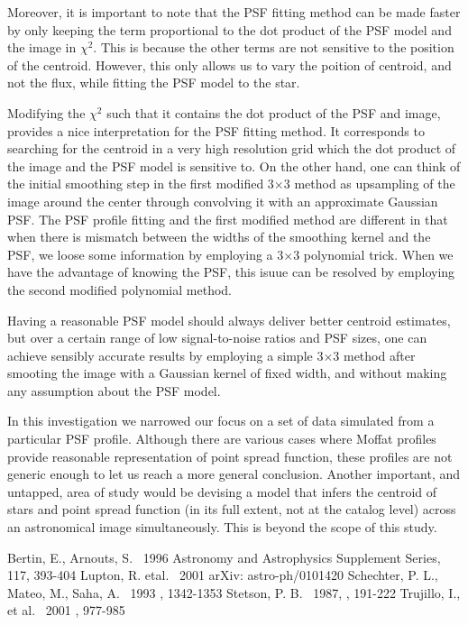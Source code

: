 \documentclass[12pt, preprint]{aastex}
\begin{document}
Moreover, it is important to note that the PSF fitting method can be made faster by only keeping the 
term proportional to the dot product of the PSF model and the image in $\chi^2$. This is because 
the other terms are not sensitive to the position of the centroid. However, this only allows
us to vary the poition of centroid, and not the flux, while fitting the PSF model
to the star. 

Modifying the $\chi^2$ such that it contains the dot product of the PSF and image, 
provides a nice interpretation for the PSF fitting method. It corresponds to searching for the 
centroid in a very high resolution grid which the dot product of the image and the PSF model is
sensitive to. On the other hand, one can think of the initial smoothing step in the first modified 3$\times$3 method 
as upsampling of the image around the center through convolving it with an approximate Gaussian PSF. 
The PSF profile fitting and the first modified method are different in that when there is mismatch between the
widths of the smoothing kernel and the PSF, we loose some information by employing a 3$\times$3 polynomial trick.
When we have the advantage of knowing the PSF, this isuue can be resolved by employing the second modified polynomial method.

Having a reasonable PSF model should always deliver better centroid estimates, but
over a certain range of low signal-to-noise ratios and PSF sizes, one can achieve sensibly
 accurate results by employing a simple 3$\times$3 method after smooting the image with
 a Gaussian kernel of fixed width, and without making any assumption about the PSF model.

In this investigation we narrowed our focus on a set of data simulated from a particular
PSF profile. Although there are various cases where Moffat profiles provide reasonable
representation of point spread function, these profiles are not generic enough to let us
reach a more general conclusion. Another important, and untapped, area of study
would be devising a model that infers the centroid of stars and point spread function
(in its full extent, not at the catalog level) across an astronomical image simultaneously.
This is beyond the scope of this study. 


\begin{thebibliography}{70}

 Bertin, E., Arnouts, S. \ 1996  Astronomy and Astrophysics Supplement Series, 117, 393-404
 Lupton, R. etal. \ 2001  arXiv: astro-ph/0101420
 Schechter, P. L., Mateo, M., Saha, A. \ 1993 \pasp, 1342-1353
 Stetson, P. B. \ 1987, \pasp, 191-222
 Trujillo, I., et al. \ 2001 \mnras, 977-985

\end{thebibliography}
\end{document}
